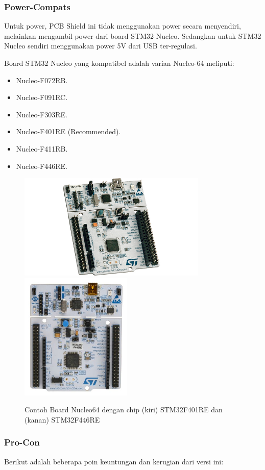\documentclass[12pt,]{article}
\begin{document}
	\subsubsection{Power-Compats}
	Untuk power, PCB Shield ini tidak menggunakan power secara menyendiri, melainkan mengambil power dari board STM32 Nucleo.
	Sedangkan untuk STM32 Nucleo sendiri menggunakan power 5V dari USB ter-regulasi.
	
	Board STM32 Nucleo yang kompatibel adalah varian Nucleo-64 meliputi:
	\begin{itemize}
		\item Nucleo-F072RB.
		\item Nucleo-F091RC. 
		\item Nucleo-F303RE.
		\item Nucleo-F401RE (Recommended).
		\item Nucleo-F411RB.
		\item Nucleo-F446RE.
	\end{itemize}

	\begin{figure}[!ht]
		\centering
		\includegraphics[width=255pt]{images/nucleof401}
		\includegraphics[width=150pt]{images/nucleof446}
		\caption{Contoh Board Nucleo64 dengan chip (kiri) STM32F401RE dan (kanan) STM32F446RE}
	\end{figure}

	\newpage
	\subsubsection{Pro-Con}
	Berikut adalah beberapa poin keuntungan dan kerugian dari versi ini:\\
	
\end{document}
